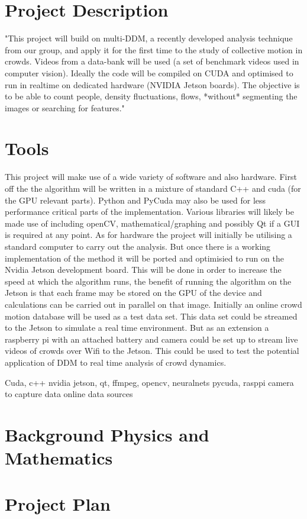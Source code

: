 \documentclass[11pt]{article}
\begin{document}
\section{Project Description}
"This project will build on multi-DDM, a recently developed analysis technique from our group,
and apply it for the first time to the study of collective motion in crowds.
Videos from a data-bank will be used (a set of benchmark videos used in computer vision).
Ideally the code will be compiled on CUDA and optimised to run in realtime on dedicated hardware (NVIDIA Jetson boards).
The objective is to be able to count people, density fluctuations, flows, *without* segmenting the images or searching for features."

\section{Tools}
This project will make use of a wide variety of software and also hardware.
First off the the algorithm will be written in a mixture of standard C++ and cuda (for the GPU relevant parts).
Python and PyCuda may also be used for less performance critical parts of the implementation.
Various libraries will likely be made use of including openCV, mathematical/graphing and possibly Qt if a GUI is required at any point.
As for hardware the project will initially be utilising a standard computer to carry out the analysis.
But once there is a working implementation of the method it will be ported and optimisied to run on the Nvidia Jetson development board.
This will be done in order to increase the speed at which the algorithm runs, the benefit of running the algorithm on the Jetson
is that each frame may be stored on the GPU of the device and calculations can be carried out in parallel on that image.
Initially an online crowd motion database will be used as a test data set.\cite{crowdMotionDB}
This data set could be streamed to the Jetson to simulate a real time environment.
But as an extension a raspberry pi with an attached battery and camera could be set up to stream live videos of crowds over Wifi to the Jetson.
This could be used to test the potential application of DDM to real time analysis of crowd dynamics.

Cuda, c++ nvidia jetson, qt, ffmpeg, opencv, neuralnets pycuda, rasppi camera to capture data online data sources
\section{Background Physics and Mathematics}

\section{Project Plan}


\printbibliography
\end{document}
